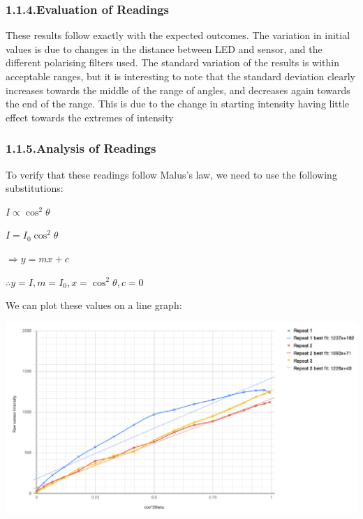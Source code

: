 \documentclass{article}
\begin{document}
\subsubsection{1.1.4.\hspace*{0.5em}Evaluation of Readings}\label{sec-evaluation-of-readings}%

\noindent{}These results follow exactly with the expected outcomes. The variation in initial values is due to changes in the distance between LED and sensor, and the different polarising filters used. The standard variation of the results is within acceptable ranges, but it is interesting to note that the standard deviation clearly increases towards the middle of the range of angles, and decreases again towards the end of the range. This is due to the change in starting intensity having little effect towards the extremes of intensity%

\subsubsection{1.1.5.\hspace*{0.5em}Analysis of Readings}\label{sec-analysis-of-readings}%

\noindent{}To verify that these readings follow Malus's law, we need to use the following substitutions:%

$I\propto\cos^2\theta$%

$I=I_0\cos^2\theta$%

$\Rightarrow y=mx+c$%

$\therefore y=I, m=I_0, x=\cos^2\theta, c=0$%

We can plot these values on a line graph:%

\includegraphics[keepaspectratio=true,width=\dimmin{}{\dimwidth{0.90}}]{images/results}{}%
\end{document}
